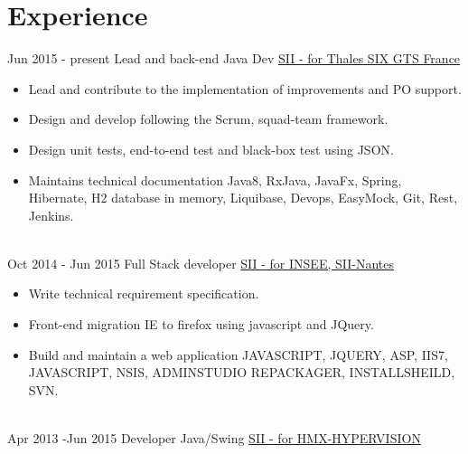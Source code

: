 \documentclass[letterpaper]{twentysecondcv_en} %
\begin{document}
\makeprofile %


\section{Experience}

\begin{twenty} %
\twentyitem
    	{Jun 2015 -}
		{present}
        {Lead and back-end Java Dev}
        {\href{https://www.thalesgroup.com/fr}{SII - for Thales SIX GTS France}}
        {}
        {\begin{itemize} 
    		\item Lead and contribute to the implementation of improvements and PO support.
    		\item Design and develop following the Scrum, squad-team framework.
    		\item Design unit tests, end-to-end test and black-box test using JSON.
		\item Maintains technical documentation
		\medskip   \newline \footnotesize  Java8, RxJava, JavaFx, Spring, Hibernate, H2 database in memory, Liquibase, Devops, EasyMock, Git, Rest, Jenkins.
        \end{itemize}}
        \\
	\twentyitem
    	{Oct 2014 -}
		{Jun 2015}
        {Full Stack developer}
        {\href{https://www.insee.fr/fr/accueil}{SII - for INSEE, SII-Nantes}}
        {}
        {
        {\begin{itemize}
		\item Write technical requirement specification.
		\item Front-end migration IE to firefox using javascript and JQuery.
		\item Build and maintain a web application
		 \medskip   \newline \footnotesize  JAVASCRIPT, JQUERY, ASP, IIS7, JAVASCRIPT, NSIS, ADMINSTUDIO REPACKAGER, INSTALLSHEILD, SVN.
    	\end{itemize}}
        }
     \\
     \twentyitem
   	{Apr 2013 -}{Jun 2015}
        {Developer Java/Swing}
        {\href{}{SII - for HMX-HYPERVISION}}
        {}
        {
       	 \begin{itemize}

\end{itemize}}
\end{twenty}
\end{document}
